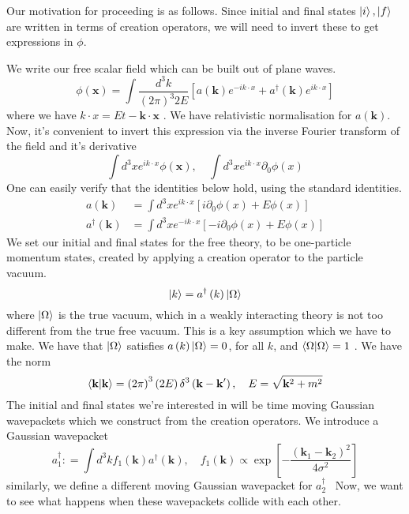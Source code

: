 \documentclass[11pt, oneside]{article}   	%
\theoremstyle{slanted}
\let\vec\mathbf
\begin{document}
Our motivation for proceeding 
is as follows. 
Since initial and final states $ \ket{ i }, \ket{ f }  $ 
are written in terms of creation operators, 
we will need to invert these to 
get expressions in $ \phi $. 

We write our free scalar field 
which can be built out of plane waves. 
\[
	\phi \left( \vec{x}  \right)  = \int \frac{d^ 3 k }{ \left( 2 \pi  \right)  ^ 3 
	2 E } \left[  a \left( \vec{k}  \right)  e^{  - i k \cdot  x } + 
a ^\dagger \left( \vec{k}  \right)  e ^{ i k \cdot  x } \right] 
\] where we have $ k \cdot  x  = E t  - \vec{k} \cdot  \vec{x} $ . 
We have relativistic 
normalisation for $ a \left( \vec{k}  \right)  $. 
Now, it's convenient to 
invert this expression via the inverse Fourier transform 
of the field and it's derivative 
\[
	\int d ^ 3 x e ^{ i k \cdot  x } \phi \left( \vec{x}  \right)  , \quad 
	\int d ^ 3 x e ^{ i k \cdot   x } \partial  _ 0 \phi \left( x    \right)  
\] One 
can easily verify that the identities below 
hold, using the standard identities. 
\begin{align*}
	a\left( \vec{k}   \right)  &=  \int d ^ 3 x e ^{ i k \cdot  x } 
	\left[  i \partial  _ 0 \phi \left( x \right) + E \phi \left( x  \right)    \right]  \\ 
	a ^\dagger \left( \vec{k}  \right)  &=  \int d ^ 3 x e ^{  - i k \cdot   x } 
	\left[   -  i \partial  _ 0 \phi (x ) + E \phi \left( x  \right)   \right] 
\end{align*}
We set our initial and final states for the free theory,
to be one-particle momentum states, 
created by applying a creation operator 
to the particle vacuum. 
\[
	\ket{ k }  = a ^\dagger \left( k  \right)  \ket{ \Omega } 
\] where $ \ket{ \Omega } $ is the true vacuum, 
which in a weakly interacting theory is 
not too different from the true free vacuum.
This is a key assumption which 
we have to make. 
We have that $ \ket{ \Omega }  $ satisfies 
$ a \left( k  \right)   \ket{ \Omega }  = 0 $, 
for all  $ k $, and $ \bra{ \Omega }\ket{ \Omega }  = 1 $ . 
We have the norm 
\[
	\bra{ \vec{k} }\ket{\vec{k}} = \left( 2 \pi  \right)  ^ 3 \left( 2 E  \right)  
	\delta ^ 3 \left( \vec{k} - \vec{k}  '  \right)  , \quad E  = \sqrt{ \vec{k}^ 2 + m ^ 2 } 
\] 
The initial and
final states we're interested in will 
be time moving Gaussian wavepackets which we 
construct from the creation operators. We introduce a Gaussian wavepacket 
\[
	a _ 1 ^\dagger : = \int d ^ 3 k f _ 1 \left( \vec{k}  \right)  a ^\dagger \left( \vec{k}  \right)  
	, \quad f _ 1 \left( \vec{k}  \right)  \propto \exp \left[  
	- \frac{\left( \vec{k}_ 1  - \vec{k} _ 2   \right)  ^ 2   }{ 4 \sigma ^ 2 }\right] 
\] similarly, we define a different moving Gaussian wavepacket for $ a _ 2 ^\dagger $ 
Now, we want to see what happens 
when these wavepackets collide with each other. 
\end{document}
